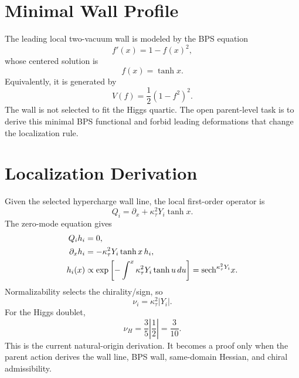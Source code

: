 \documentclass[11pt]{article}
\begin{document}
\section{Minimal Wall Profile}
The leading local two-vacuum wall is modeled by the BPS equation
\begin{equation}
f'(x)=1-f(x)^2,
\end{equation}
whose centered solution is
\begin{equation}
f(x)=\tanh x.
\end{equation}
Equivalently, it is generated by
\begin{equation}
V(f)=\frac12(1-f^2)^2.
\end{equation}
The wall is not selected to fit the Higgs quartic.  The open parent-level task
is to derive this minimal BPS functional and forbid leading deformations that
change the localization rule.

\section{Localization Derivation}
Given the selected hypercharge wall line, the local first-order operator is
\begin{equation}
Q_i=\partial_x+\kappa_\tau^2Y_i\tanh x.
\end{equation}
The zero-mode equation gives
\begin{align}
Q_i h_i&=0,\\
\partial_x h_i&=-\kappa_\tau^2Y_i\tanh x\,h_i,\\
h_i(x)&\propto
\exp\left[-\int^x\kappa_\tau^2Y_i\tanh u\,du\right]
={\rm sech}^{\kappa_\tau^2Y_i}x.
\end{align}
Normalizability selects the chirality/sign, so
\begin{equation}
\nu_i=\kappa_\tau^2|Y_i|.
\end{equation}
For the Higgs doublet,
\begin{equation}
\nu_H=\frac35\left|\frac12\right|=\frac3{10}.
\end{equation}
This is the current natural-origin derivation.  It becomes a proof only when
the parent action derives the wall line, BPS wall, same-domain Hessian, and
chiral admissibility.
\end{document}
